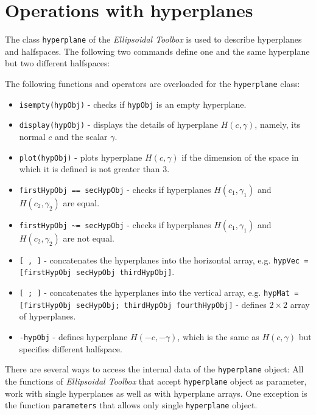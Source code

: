 \section{Operations with hyperplanes}
The class {\tt hyperplane} of the {\it Ellipsoidal Toolbox} is used
to describe hyperplanes and halfspaces. The following two commands
define one and the same hyperplane but two different halfspaces:

The following functions and operators are overloaded for the
{\tt hyperplane} class:
\begin{itemize}
\item {\tt isempty(hypObj)} - checks if {\tt hypObj} is an empty hyperplane.
\item {\tt display(hypObj)} - displays the details of hyperplane $H(c,\gamma)$,
namely, its normal $c$ and the scalar $\gamma$.
\item {\tt plot(hypObj)} - plots hyperplane $H(c,\gamma)$ if the dimension of the
space in which it is defined  is not greater than 3.
\item {\tt firstHypObj == secHypObj} - checks if hyperplanes $H(c_1,\gamma_1)$ and
$H(c_2,\gamma_2)$ are equal.
\item {\tt firstHypObj \~{ }= secHypObj} - checks if hyperplanes $H(c_1,\gamma_1)$ and
$H(c_2,\gamma_2)$ are not equal.
\item {\tt [ , ]} - concatenates the hyperplanes into the horizontal array, e.g.
{\tt hypVec = [firstHypObj secHypObj thirdHypObj]}.
\item {\tt [ ; ]} - concatenates the hyperplanes into the vertical array, e.g.
{\tt hypMat = [firstHypObj secHypObj; thirdHypObj fourthHypObj]} - defines $2\times 2$ array of hyperplanes.
\item {\tt -hypObj} - defines hyperplane $H(-c,-\gamma)$, which is the same
as $H(c,\gamma)$ but specifies different halfspace.
\end{itemize}

There are several ways to access the internal data of the {\tt hyperplane}
object:
All the functions of {\it Ellipsoidal Toolbox} that accept {\tt hyperplane}
object as parameter, work with single hyperplanes as well as with hyperplane
arrays. One exception is the function {\tt parameters} that allows only
single {\tt hyperplane} object.

